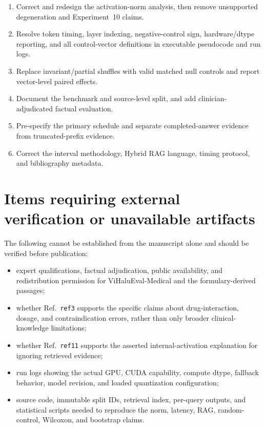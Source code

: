 \documentclass[11pt]{article}
\begin{document}
\begin{enumerate}
 \item Correct and redesign the activation-norm analysis, then remove unsupported degeneration and Experiment~10 claims.
 \item Resolve token timing, layer indexing, negative-control sign, hardware/dtype reporting, and all control-vector definitions in executable pseudocode and run logs.
 \item Replace invariant/partial shuffles with valid matched null controls and report vector-level paired effects.
 \item Document the benchmark and source-level split, and add clinician-adjudicated factual evaluation.
 \item Pre-specify the primary schedule and separate completed-answer evidence from truncated-prefix evidence.
 \item Correct the interval methodology, Hybrid RAG language, timing protocol, and bibliography metadata.
\end{enumerate}

\section*{Items requiring external verification or unavailable artifacts}

The following cannot be established from the manuscript alone and should be verified before publication:

\begin{itemize}
 \item expert qualifications, factual adjudication, public availability, and redistribution permission for ViHaluEval-Medical and the formulary-derived passages;
 \item whether Ref.~\texttt{ref3} supports the specific claims about drug-interaction, dosage, and contraindication errors, rather than only broader clinical-knowledge limitations;
 \item whether Ref.~\texttt{ref11} supports the asserted internal-activation explanation for ignoring retrieved evidence;
 \item run logs showing the actual GPU, CUDA capability, compute dtype, fallback behavior, model revision, and loaded quantization configuration;
 \item source code, immutable split IDs, retrieval index, per-query outputs, and statistical scripts needed to reproduce the norm, latency, RAG, random-control, Wilcoxon, and bootstrap claims.
\end{itemize}
\end{document}
